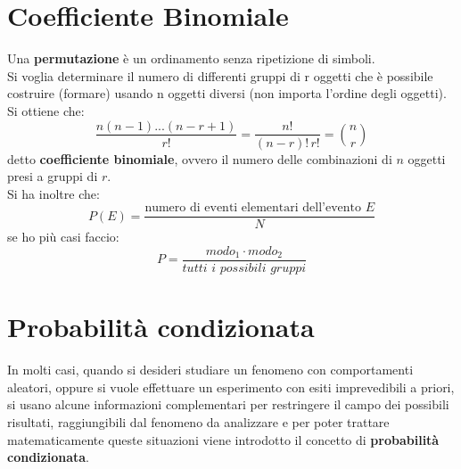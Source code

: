 \documentclass[a4paper,12pt, oneside]{book}
\begin{document}
\section{Coefficiente Binomiale}
Una \textbf{permutazione} è un ordinamento senza ripetizione di simboli.\\
Si voglia determinare il numero di differenti gruppi di r oggetti che è possibile costruire
(formare) usando n oggetti diversi (non importa l’ordine degli oggetti). Si ottiene che:
\[\frac{n(n-1)...(n-r+1)}{r!}=\frac{n!}{(n-r)!\,r!}= {n\choose r}\]
detto \textbf{coefficiente binomiale}, ovvero il numero delle combinazioni di $n$ oggetti presi a gruppi di $r$.\\
Si ha inoltre che:
\[P(E)=\frac{\mbox{numero di eventi elementari dell'evento }E}{N}\]
se ho più casi faccio:
\[P=\frac{modo_1\cdot modo_2}{tutti\,\, i\,\, possibili\,\, gruppi}\]

\section{Probabilità condizionata}
In molti casi, quando si desideri studiare un fenomeno con comportamenti aleatori, oppure si vuole effettuare
un esperimento con esiti imprevedibili a priori, si usano alcune informazioni complementari per restringere 
il campo dei possibili risultati, raggiungibili dal fenomeno da analizzare e per poter trattare matematicamente
queste situazioni viene introdotto il concetto di \textbf{probabilità condizionata}.
\end{document}
